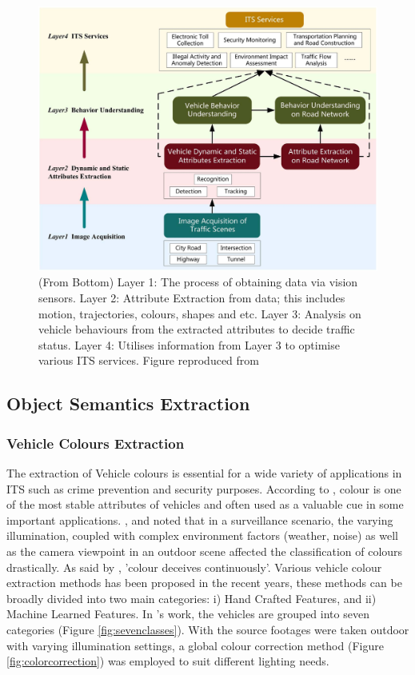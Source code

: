 \begin{figure}[hbt!]\centering
 \includegraphics[width=1\textwidth]{image/lit/ITS.png}
 \caption[Overview of the General Frameworks for ITSs]{(From Bottom) Layer 1:
 The process of obtaining data via vision sensors. Layer 2: Attribute
 Extraction from data; this includes motion, trajectories, colours, shapes
 and etc. Layer 3: Analysis on vehicle behaviours from the extracted
 attributes to decide traffic status. Layer 4: Utilises information from
 Layer 3 to optimise various ITS services. Figure reproduced
 from~}
 \label{fig:ITSoverview}
\end{figure}


\subsection{Object Semantics Extraction}

\subsubsection{Vehicle Colours Extraction}
The extraction of Vehicle colours is essential for a wide variety of
applications in ITS such as crime prevention and security purposes.
According to , colour is one of the
most stable attributes of vehicles and often used as a valuable cue in some
important applications. ,  and
 noted that in a surveillance scenario, the varying
illumination, coupled with complex environment factors (weather, noise) as well
as the camera viewpoint in an outdoor scene affected the classification of
colours drastically. As said by , 'colour
deceives continuously'.
Various vehicle colour extraction methods has been proposed in the recent
years, these methods can be broadly divided into two main categories:
i) Hand Crafted Features, and ii) Machine Learned Features. In
's work, the vehicles are grouped into seven categories
(Figure \ref{fig:sevenclasses}). With the source footages were taken
outdoor with varying illumination settings, a global colour correction method
(Figure \ref{fig:colorcorrection}) was employed to suit different lighting
needs.

